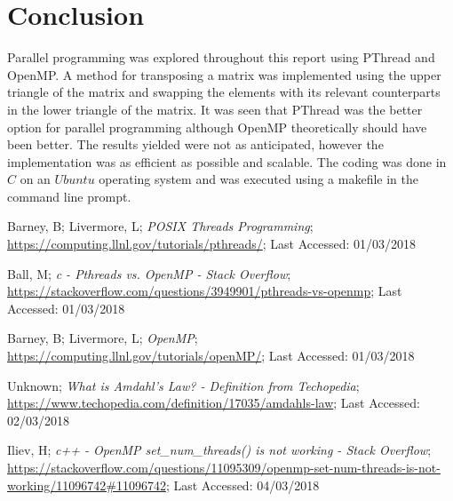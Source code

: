 \documentclass[10pt, conference]{IEEEtran}
\begin{document}
\section{Conclusion}
\label{Conclusion}
Parallel programming was explored throughout this report using PThread and OpenMP. A method for transposing a matrix was implemented using the upper triangle of the matrix and swapping the elements with its relevant counterparts in the lower triangle of the matrix. It was seen that PThread was the better option for parallel programming although OpenMP theoretically should have been better. The results yielded were not as anticipated, however the implementation was as efficient as possible and scalable. The coding was done in $C$ on an $Ubuntu$ operating system and was executed using a makefile in the command line prompt.


\begin{thebibliography}{}

Barney, B; Livermore, L; \emph{POSIX Threads Programming}; \url{https://computing.llnl.gov/tutorials/pthreads/}; Last Accessed: 01/03/2018

Ball, M; \emph{c - Pthreads vs. OpenMP - Stack Overflow}; \url{https://stackoverflow.com/questions/3949901/pthreads-vs-openmp}; Last Accessed: 01/03/2018

Barney, B; Livermore, L; \emph{OpenMP}; \url{https://computing.llnl.gov/tutorials/openMP/}; Last Accessed: 01/03/2018

Unknown; \emph{What is Amdahl's Law? - Definition from Techopedia}; \url{https://www.techopedia.com/definition/17035/amdahls-law}; Last Accessed: 02/03/2018

Iliev, H; \emph{c++ - OpenMP set\_num\_threads() is not working - Stack Overflow}; \url{https://stackoverflow.com/questions/11095309/openmp-set-num-threads-is-not-working/11096742#11096742}; Last Accessed: 04/03/2018

\end{thebibliography}
\end{document}

